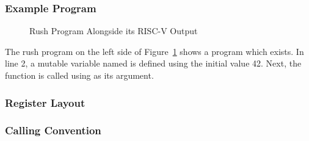 \subsubsection{Example Program}

\noindent
\begin{figure}[h]
	\begin{minipage}{.4\textwidth}
	\end{minipage}%
	\begin{minipage}{.6\textwidth}
	\end{minipage}
	\caption{Rush Program Alongside its RISC-V Output}\label{fig:rush_riscv_split}
\end{figure}

The rush program on the left side of Figure~\ref{fig:rush_riscv_split} shows a program which exists.
In line 2, a mutable variable named  is defined using the initial value 42.
Next, the  function is called using  as its argument.

\subsubsection{Register Layout}

\subsubsection{Calling Convention}

